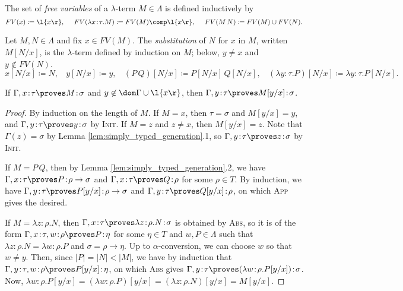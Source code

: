 \documentclass[reqno]{amsart}
\begin{document}
    \begin{definition}
        The set of \textit{free variables} of a $\lambda$-term $M\in\Lambda$ is defined inductively by
        \begin{equation*}
            FV(x)\coloneqq\l\{x\r\},\ \ \ \ FV(\lambda x\!:\!\tau.M)\coloneqq FV(M)\comp\l\{x\r\},\ \ \ \ FV(M\,N)\coloneqq FV(M)\cup FV(N).
        \end{equation*}
    \end{definition}

    \begin{definition}
        Let $M,N\in\Lambda$ and fix $x\in FV(M)$. The \textit{substitution} of $N$ for $x$ in $M$, written $M[N/x]$, is the $\lambda$-term defined by induction on $M$; below, $y\neq x$ and $y\not\in FV(N)$.
        \begin{equation*}
            x[N/x]\coloneqq N,\ \ \ \ y[N/x]\coloneqq y,\ \ \ \ (P\,Q)[N/x]\coloneqq P[N/x]\,Q[N/x],\ \ \ \ (\lambda y\!:\!\tau.P)[N/x]\coloneqq\lambda y\!:\!\tau.P[N/x].
        \end{equation*}
    \end{definition}

    \begin{lemma}\label{lem:simply_typed_variable_substitution}
        If $\Gamma,x\!:\!\tau\proves M\!:\!\sigma$ and $y\not\in\dom\Gamma\cup\l\{x\r\}$, then $\Gamma,y\!:\!\tau\proves M[y/x]\!:\!\sigma$.
    \end{lemma}
    \begin{proof}
        By induction on the length of $M$. If $M=x$, then $\tau=\sigma$ and $M[y/x]=y$, and $\Gamma,y\!:\!\tau\proves y\!:\!\sigma$ by \textsc{Init}. If $M=z$ and $z\neq x$, then $M[y/x]=z$. Note that $\Gamma(z)=\sigma$ by Lemma \ref{lem:simply_typed_generation}.1, so $\Gamma,y\!:\!\tau\proves z\!:\!\sigma$ by \textsc{Init}.

        If $M=P\,Q$, then by Lemma \ref{lem:simply_typed_generation}.2, we have $\Gamma,x\!:\!\tau\proves P\!:\!\rho\rightarrow\sigma$ and $\Gamma,x\!:\!\tau\proves Q\!:\!\rho$ for some $\rho\in T$. By induction, we have $\Gamma,y\!:\!\tau\proves P[y/x]\!:\!\rho\rightarrow\sigma$ and $\Gamma,y\!:\!\tau\proves Q[y/x]\!:\!\rho$, on which \textsc{App} gives the desired.

        If $M=\lambda z\!:\!\rho.N$, then $\Gamma,x\!:\!\tau\proves\lambda z\!:\!\rho.N\!:\!\sigma$ is obtained by \textsc{Abs}, so it is of the form $\Gamma,x\!:\!\tau,w\!:\!\rho\proves P\!:\!\eta$ for some $\eta\in T$ and $w,P\in\Lambda$ such that $\lambda z\!:\!\rho.N=\lambda w\!:\!\rho.P$ and $\sigma=\rho\to\eta$. Up to $\alpha$-conversion, we can choose $w$ so that $w\neq y$. Then, since $|P|=|N|<|M|$, we have by induction that $\Gamma,y\!:\!\tau,w\!:\!\rho\proves P[y/x]\!:\!\eta$, on which \textsc{Abs} gives $\Gamma,y\!:\!\tau\proves(\lambda w\!:\!\rho.P[y/x])\!:\!\sigma$. Now, $\lambda w\!:\!\rho.P[y/x]=(\lambda w\!:\!\rho.P)[y/x]=(\lambda z\!:\!\rho.N)[y/x]=M[y/x]$.
    \end{proof}
\end{document}
